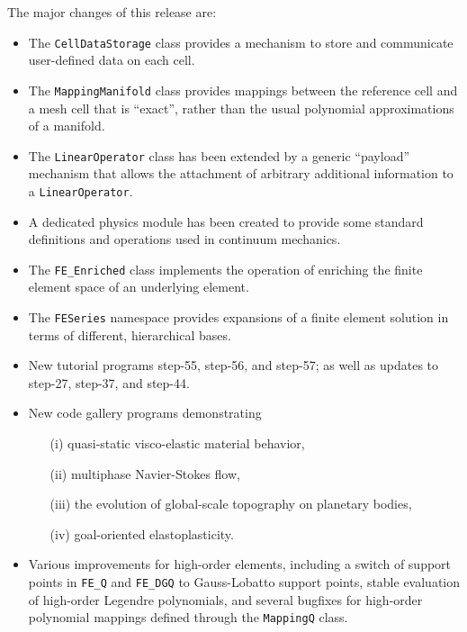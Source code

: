 \documentclass{ansarticle-preprint}
\begin{document}
The major changes of this release are:
\begin{itemize}
\item The \texttt{CellDataStorage} class provides a mechanism to store
  and communicate user-defined data on each cell. 

\item The \texttt{MappingManifold} class provides mappings between the
  reference cell and a mesh cell that is ``exact'', rather than the
  usual polynomial approximations of a manifold.

\item The \texttt{LinearOperator} class has been extended by a generic
  ``payload'' mechanism that allows the attachment of arbitrary additional
  information to a \texttt{LinearOperator}.

\item A dedicated physics module has been created to provide some standard
  definitions and operations used in continuum mechanics.

\item The \texttt{FE\_Enriched} class implements the operation of
  enriching the finite element space of an underlying element.

\item The \texttt{FESeries} namespace provides expansions of a finite
  element solution in terms of different, hierarchical bases.

\item New tutorial programs step-55, step-56, and step-57; as well as
  updates to step-27, step-37, and step-44.

\item New code gallery programs demonstrating
  \begin{enumerate}
    \item[(i)] quasi-static visco-elastic material behavior,
    \item[(ii)] multiphase Navier-Stokes flow,
    \item[(iii)] the evolution of global-scale topography on planetary bodies,
    \item[(iv)] goal-oriented elastoplasticity.
  \end{enumerate}

\item Various improvements for high-order elements, including a switch of
  support points in \texttt{FE\_Q} and \texttt{FE\_DGQ} to Gauss-Lobatto
  support points, stable evaluation of high-order Legendre polynomials, and
  several bugfixes for high-order polynomial mappings defined through the
  \texttt{MappingQ} class.



\end{itemize}
\end{document}
